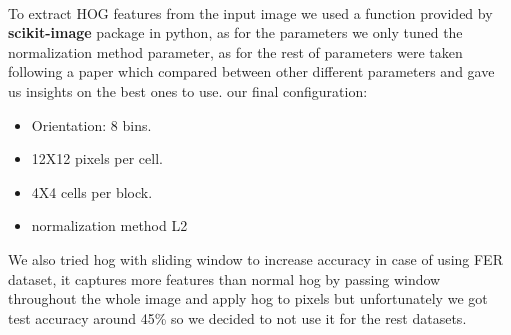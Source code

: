 \paragraph{}
To extract HOG features from the input image we used a function provided by \textbf{scikit-image} package in python, as for the parameters we only tuned the normalization method parameter, as for the rest of parameters were taken following a paper\cite{hog} which compared between other different parameters and gave us insights on the best ones to use.\newline 
our final configuration:
\begin{itemize}[noitemsep]
\item Orientation: 8 bins. 
\item 12X12 pixels per cell. 
\item 4X4 cells per block.
\item normalization method L2
\end{itemize}

We also tried hog with sliding window to increase accuracy in case of using FER dataset, it captures more features than normal hog by passing window throughout the whole image and apply hog to pixels but unfortunately we got test accuracy around 45\% so we decided to not use it for the rest datasets.

